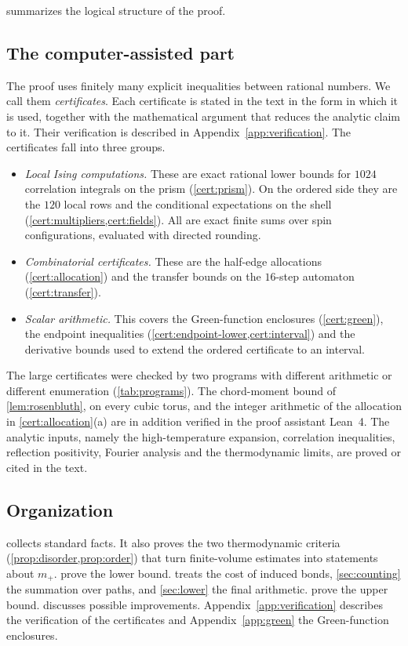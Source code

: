  summarizes the logical structure of the proof.



\subsection{The computer-assisted part}\label{sec:intro-cap}

The proof uses finitely many explicit inequalities between rational numbers. We call them \emph{certificates}. Each certificate is stated in the text in the form in which it is used, together with the mathematical argument that reduces the analytic claim to it. Their verification is described in Appendix~\ref{app:verification}. The certificates fall into three groups.
\begin{itemize}
\item \emph{Local Ising computations.} These are exact rational lower bounds for $1024$ correlation integrals on the prism (\cref{cert:prism}). On the ordered side they are the $120$ local rows and the conditional expectations on the shell (\cref{cert:multipliers,cert:fields}). All are exact finite sums over spin configurations, evaluated with directed rounding.
\item \emph{Combinatorial certificates.} These are the half-edge allocations (\cref{cert:allocation}) and the transfer bounds on the $16$-step automaton (\cref{cert:transfer}).
\item \emph{Scalar arithmetic.} This covers the Green-function enclosures (\cref{cert:green}), the endpoint inequalities (\cref{cert:endpoint-lower,cert:interval}) and the derivative bounds used to extend the ordered certificate to an interval.
\end{itemize}
The large certificates were checked by two programs with different arithmetic or different enumeration (\cref{tab:programs}). The chord-moment bound of \cref{lem:rosenbluth}, on every cubic torus, and the integer arithmetic of the allocation in \cref{cert:allocation}(a) are in addition verified in the proof assistant Lean~4. The analytic inputs, namely the high-temperature expansion, correlation inequalities, reflection positivity, Fourier analysis and the thermodynamic limits, are proved or cited in the text.

\subsection{Organization}

 collects standard facts. It also proves the two thermodynamic criteria (\cref{prop:disorder,prop:order}) that turn finite-volume estimates into statements about $m_+$.  prove the lower bound.  treats the cost of induced bonds, \cref{sec:counting} the summation over paths, and \cref{sec:lower} the final arithmetic.  prove the upper bound.  discusses possible improvements. Appendix~\ref{app:verification} describes the verification of the certificates and Appendix~\ref{app:green} the Green-function enclosures.
